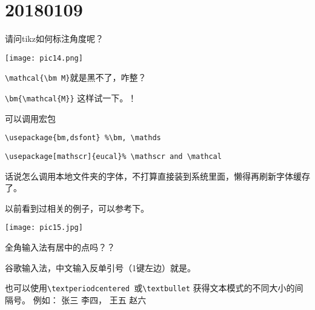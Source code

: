 \documentclass[QAofGroup.tex]{subfiles}
\begin{document}
%
%

\chapter{20180109}\label{ch180109}

\begin{qst}\label{Q2018010901}
请问tikz如何标注角度呢？
\end{qst}
\ans {}

\texttt{[image: pic14.png]}

\begin{qst}\label{Q2018010902}
\verb|\mathcal{\bm M}|就是黑不了，咋整？
\end{qst}
\ans \verb|\bm{\mathcal{M}}| 这样试一下。！

可以调用宏包

\verb|\usepackage{bm,dsfont} %\bm, \mathds|

\verb|\usepackage[mathscr]{eucal}% \mathscr and \mathcal|

\begin{qst}\label{Q2018010903}
话说怎么调用本地文件夹的字体，不打算直接装到系统里面，懒得再刷新字体缓存了。
\end{qst}
\ans
以前看到过相关的例子，可以参考下。


\texttt{[image: pic15.jpg]}

\begin{qst}\label{Q2018010904}
全角输入法有居中的点吗？？
\end{qst}
\ans 谷歌输入法，中文输入反单引号（1键左边）就是。

也可以使用\verb|\textperiodcentered |或\verb|\textbullet| 获得文本模式的不同大小的间隔号。
例如：
张三 \textperiodcentered 李四， \quad
王五 \textbullet 赵六
\end{document}
